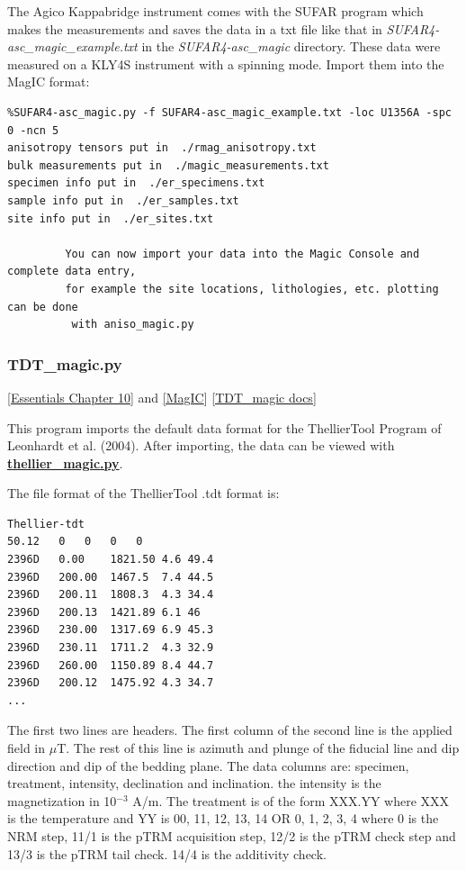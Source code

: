 \documentclass[11pt]{book}
\begin{document}
{{The Agico Kappabridge instrument comes with the SUFAR program which makes the measurements and saves the data in a txt file like that in {\it SUFAR4-asc\_magic\_example.txt} in the {\it SUFAR4-asc\_magic} directory.  These data were measured on a KLY4S instrument with a spinning mode.    Import them into the MagIC format:

\begin{verbatim}
%SUFAR4-asc_magic.py -f SUFAR4-asc_magic_example.txt -loc U1356A -spc 0 -ncn 5
anisotropy tensors put in  ./rmag_anisotropy.txt
bulk measurements put in  ./magic_measurements.txt
specimen info put in  ./er_specimens.txt
sample info put in  ./er_samples.txt
site info put in  ./er_sites.txt

         You can now import your data into the Magic Console and complete data entry,
         for example the site locations, lithologies, etc. plotting can be done
          with aniso_magic.py
\end{verbatim}



\subsubsection{TDT\_magic.py}
\href{http://earthref.org/MAGIC/books/Tauxe/Essentials/WebBook3ch10.html#ch10}{ [Essentials Chapter 10]} and \href{#MagIC}{[MagIC}]
\href{https://github.com/PmagPy/PmagPy/blob/master/programs/TDT_magic.py}{[TDT\_magic docs]}

This program imports the default data format for the ThellierTool Program of Leonhardt et al. (2004). \nocite{leonhardt04}  After importing, the data can be viewed with \href{#thellier_magic.py}{\bf thellier\_magic.py}.

The file format of the ThellierTool  .tdt format is:
\begin{verbatim}
Thellier-tdt
50.12	0	0	0	0
2396D	0.00	1821.50	4.6	49.4
2396D	200.00	1467.5	7.4	44.5
2396D	200.11	1808.3	4.3	34.4
2396D	200.13	1421.89	6.1	46
2396D	230.00	1317.69	6.9	45.3
2396D	230.11	1711.2	4.3	32.9
2396D	260.00	1150.89	8.4	44.7
2396D	200.12	1475.92	4.3	34.7
...
\end{verbatim}
The first two lines are headers.  The first column of the second line is the applied field in $\mu$T. The rest of this line is azimuth and plunge of the fiducial line and dip direction and dip of the bedding plane.
The data columns are:
specimen, treatment, intensity,  declination and inclination.
the intensity is the magnetization in 10$^{-3}$ A/m.   The treatment is of the form XXX.YY  where XXX is the temperature and YY is   00, 11, 12, 13, 14  OR 0, 1, 2, 3, 4   where 0 is the NRM step, 11/1 is the pTRM acquisition step, 12/2 is the pTRM check step and 13/3 is the pTRM tail check.  14/4 is the additivity check.

}}
\end{document}
